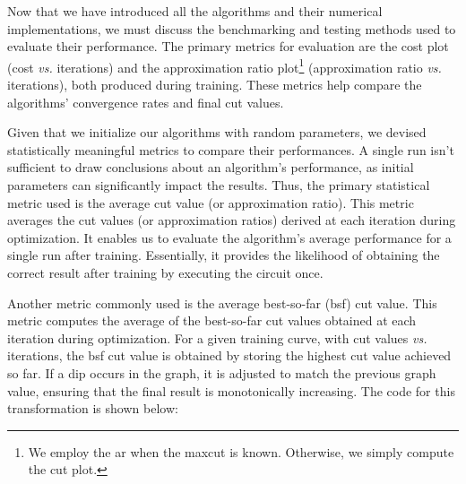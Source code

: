


Now that we have introduced all the algorithms and their numerical implementations, we must discuss the benchmarking and testing methods used to evaluate their performance. The primary metrics for evaluation are the cost plot (cost \textit{vs.} iterations) and the approximation ratio plot\footnote{We employ the \acrshort{ar} when the \acrshort{maxcut} is known. Otherwise, we simply compute the cut plot.} (approximation ratio \textit{vs.} iterations), both produced during training. These metrics help compare the algorithms' convergence rates and final cut values.

Given that we initialize our algorithms with random parameters, we devised statistically meaningful metrics to compare their performances. A single run isn't sufficient to draw conclusions about an algorithm's performance, as initial parameters can significantly impact the results. Thus, the primary statistical metric used is the average cut value (or approximation ratio). This metric averages the cut values (or approximation ratios) derived at each iteration during optimization. It enables us to evaluate the algorithm's average performance for a single run after training. Essentially, it provides the likelihood of obtaining the correct result after training by executing the circuit once. 

Another metric commonly used is the average best-so-far (\acrshort{bsf}) cut value. This metric computes the average of the best-so-far cut values obtained at each iteration during optimization. For a given training curve, with cut values \textit{vs.} iterations, the \acrshort{bsf} cut value is obtained by storing the highest cut value achieved so far. If a dip occurs in the graph, it is adjusted to match the previous graph value, ensuring that the final result is monotonically increasing. The code for this transformation is shown below:

